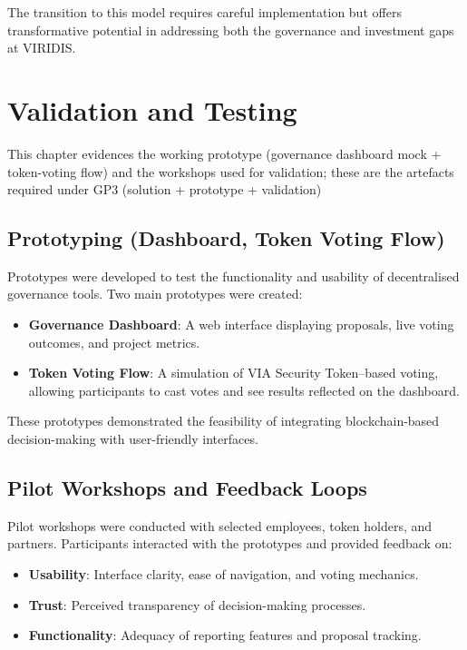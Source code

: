 \documentclass[
  english,
  12pt,
  oneside,
  open=any]{scrbook}
\providecommand{\tightlist}{%
  \setlength{\itemsep}{0pt}\setlength{\parskip}{0pt}}\usepackage{longtable,booktabs,array}
\begin{document}
The transition to this model requires careful implementation but offers
transformative potential in addressing both the governance and
investment gaps at VIRIDIS.

\chapter{Validation and Testing}\label{sec-validation}

This chapter evidences the working prototype (governance dashboard mock
+ token-voting flow) and the workshops used for validation; these are
the artefacts required under GP3 (solution + prototype + validation)

\section{Prototyping (Dashboard, Token Voting
Flow)}\label{sec-prototype}

Prototypes were developed to test the functionality and usability of
decentralised governance tools. Two main prototypes were created:

\begin{itemize}
\tightlist
\item
  \textbf{Governance Dashboard}: A web interface displaying proposals,
  live voting outcomes, and project metrics.\\
\item
  \textbf{Token Voting Flow}: A simulation of VIA Security Token--based
  voting, allowing participants to cast votes and see results reflected
  on the dashboard.
\end{itemize}

These prototypes demonstrated the feasibility of integrating
blockchain-based decision-making with user-friendly interfaces.

\section{Pilot Workshops and Feedback Loops}\label{sec-workshops}

Pilot workshops were conducted with selected employees, token holders,
and partners. Participants interacted with the prototypes and provided
feedback on:

\begin{itemize}
\tightlist
\item
  \textbf{Usability}: Interface clarity, ease of navigation, and voting
  mechanics.\\
\item
  \textbf{Trust}: Perceived transparency of decision-making processes.\\
\item
  \textbf{Functionality}: Adequacy of reporting features and proposal
  tracking.
\end{itemize}
\end{document}
